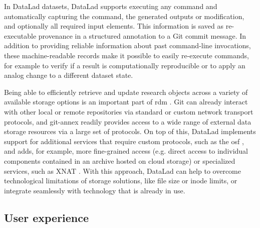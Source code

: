 {In DataLad datasets, DataLad supports executing any command and automatically capturing the command, the generated outputs or modification, and optionally all required input elements.
This information is saved as re-executable provenance in a structured annotation to a Git commit message.
In addition to providing reliable information about past command-line invocations, these machine-readable records make it possible to easily re-execute commands, for example to verify if a result is computationally reproducible or to apply an analog change to a different dataset state.

Being able to efficiently retrieve and update research objects across a variety of available storage options is an important part of \gls{rdm} \citep{borghi2018data}.
Git can already interact with other local or remote repositories via standard or custom network transport protocols, and git-annex readily provides access to a wide range of external data storage resources via a large set of protocols.
On top of this, DataLad implements support for additional services that require custom protocols, such as the \gls{osf} \citep{hanke2021dlosf}, and adds, for example, more fine-grained access (e.g. direct access to individual components contained in an archive hosted on cloud storage) or specialized services, such as XNAT \citep[\url{www.xnat.org},][]{halchenko2021xnat}.
With this approach, DataLad can help to overcome technological limitations of storage solutions, like file size or inode limits, or integrate seamlessly with technology that is already in use.



\subsection{User experience}

}
